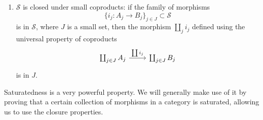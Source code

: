 \documentclass[main.tex]{subfiles}
\begin{document}
\begin{definition}[saturated]
\begin{enumerate}
    \item $\mathcal{S}$ is closed under small coproducts: if the family of morphisms
      \begin{equation*}
        \{i_{j}\colon A_{j} \to B_{j}\}_{j \in J} \subset \mathcal{S}
      \end{equation*}
      is in $\mathcal{S}$, where $J$ is a small set, then the morphism $\coprod_{j} i_{j}$ defined using the universal property of coproducts
      \begin{equation*}
        \begin{tikzcd}
          \coprod_{j \in J} A_{j}
          \arrow[r, "\coprod i_{j}"]
          & \coprod_{j \in J} B_{j}
        \end{tikzcd}
      \end{equation*}
      is in $J$.
  \end{enumerate}
\end{definition}

Saturatedness is a very powerful property. We will generally make use of it by proving that a certain collection of morphisms in a category is saturated, allowing us to use the closure properties.
\end{document}
